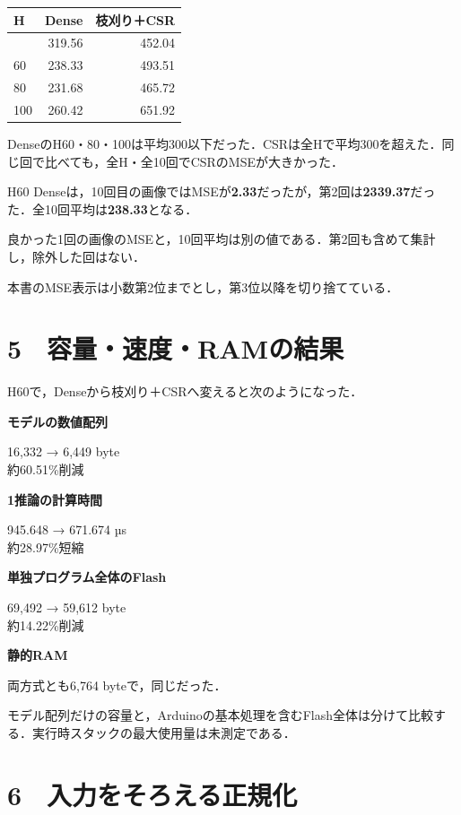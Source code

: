 \documentclass[
  14pt,
  a5paper,
]{extarticle}
\begin{document}
\begin{longtable}[]{@{}lrr@{}}
\toprule\noalign{}
H & Dense & 枝刈り＋CSR \\
\midrule\noalign{}
\endhead
\bottomrule\noalign{}
\endlastfoot
40 & 319.56 & 452.04 \\
60 & 238.33 & 493.51 \\
80 & 231.68 & 465.72 \\
100 & 260.42 & 651.92 \\
\end{longtable}

DenseのH60・80・100は平均300以下だった．CSRは全Hで平均300を超えた．同じ回で比べても，全H・全10回でCSRのMSEが大きかった．

H60
Denseは，10回目の画像ではMSEが\textbf{2.33}だったが，第2回は\textbf{2339.37}だった．全10回平均は\textbf{238.33}となる．

良かった1回の画像のMSEと，10回平均は別の値である．第2回も含めて集計し，除外した回はない．

本書のMSE表示は小数第2位までとし，第3位以降を切り捨てている．

\newpage

\section{5　容量・速度・RAMの結果}\label{ux5bb9ux91cfux901fux5ea6ramux306eux7d50ux679c}

H60で，Denseから枝刈り＋CSRへ変えると次のようになった．

\textbf{モデルの数値配列}

16,332 → 6,449 byte\\
約60.51\%削減

\textbf{1推論の計算時間}

945.648 → 671.674 µs\\
約28.97\%短縮

\textbf{単独プログラム全体のFlash}

69,492 → 59,612 byte\\
約14.22\%削減

\textbf{静的RAM}

両方式とも6,764 byteで，同じだった．

モデル配列だけの容量と，Arduinoの基本処理を含むFlash全体は分けて比較する．実行時スタックの最大使用量は未測定である．

\newpage

\section{6　入力をそろえる正規化}\label{ux5165ux529bux3092ux305dux308dux3048ux308bux6b63ux898fux5316}
\end{document}
